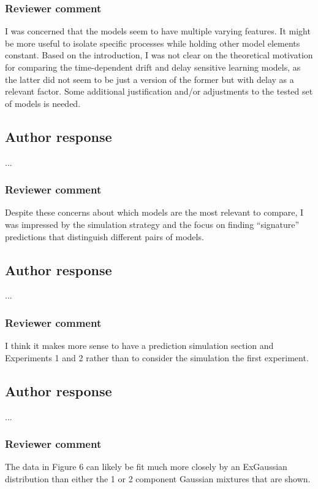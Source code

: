 \documentclass[12pt]{article}
\begin{document}
\subsubsection{Reviewer comment}
I was concerned that the models seem to have multiple
varying features. It might be more useful to isolate
specific processes while holding other model elements
constant. Based on the introduction, I was not clear on the
theoretical motivation for comparing the time-dependent
drift and delay sensitive learning models, as the latter did
not seem to be just a version of the former but with delay
as a relevant factor. Some additional justification and/or
adjustments to the tested set of models is needed.

\subsection{Author response}
...

\subsubsection{Reviewer comment}
Despite these concerns about which models are the most
relevant to compare, I was impressed by the simulation
strategy and the focus on finding “signature” predictions
that distinguish different pairs of models.

\subsection{Author response}
...

\subsubsection{Reviewer comment}
I think it makes more sense to have a prediction simulation
section and Experiments 1 and 2 rather than to consider the
simulation the first experiment.

\subsection{Author response}
...

\subsubsection{Reviewer comment}
The data in Figure 6 can likely be fit much more closely by
an ExGaussian distribution than either the 1 or 2 component
Gaussian mixtures that are shown.
\end{document}
